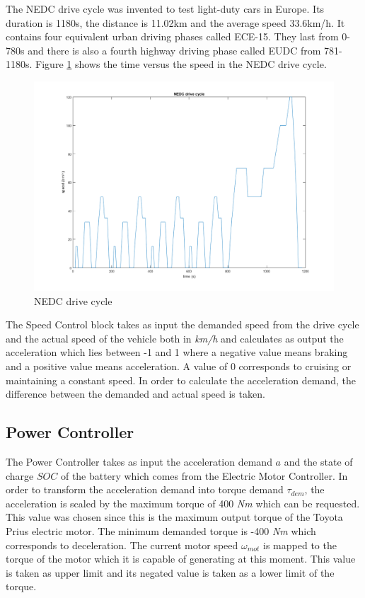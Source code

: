 The NEDC drive cycle was invented to test light-duty cars in Europe. Its duration is 1180s, the distance is 11.02km and the average speed 33.6km/h. It contains four equivalent urban driving phases called ECE-15. They last from 0-780s and there is also a fourth highway driving phase called EUDC from 781-1180s. Figure \ref{fig:nedc} shows the time versus the speed in the NEDC drive cycle.

\begin{figure}[h]
\centering
\includegraphics[scale=0.45]{figures/NEDC}
\caption{NEDC drive cycle}
\label{fig:nedc}
\end{figure}

The Speed Control block takes as input the demanded speed from the drive cycle and the actual speed of the vehicle both in \textit{km/h} and calculates as output the acceleration which lies between -1 and 1 where a negative value means braking and a positive value means acceleration. A value of 0 corresponds to cruising or maintaining a constant speed. In order to calculate the acceleration demand, the difference between the demanded and actual speed is taken.

\subsection{Power Controller}
The Power Controller takes as input the acceleration demand $a$ and the state of charge $SOC$ of the battery which comes from the Electric Motor Controller. In order to transform the acceleration demand into torque demand $\tau_{dem}$, the acceleration is scaled by the maximum torque of 400 \textit{Nm} which can be requested. This value was chosen since this is the maximum output torque of the Toyota Prius electric motor. The minimum demanded torque is -400 \textit{Nm} which corresponds to deceleration. The current motor speed $\omega_{mot}$ is mapped to the torque of the motor which it is capable of generating at this moment. This value is taken as upper limit and its negated value is taken as a lower limit of the torque. 

